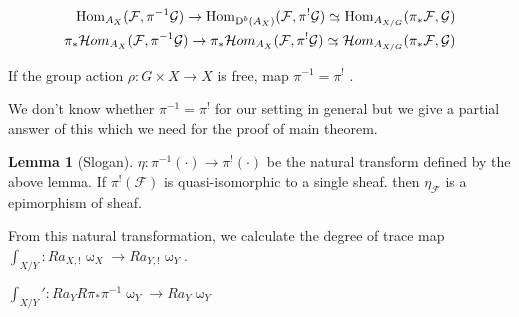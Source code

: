 \documentclass[a4paper,dvipdfmx,reqno,12pt]{amsart}
\theoremstyle{definition}
\newtheorem{Lem}[Thm]{Lemma}
\newcommand{\mcal}[1]{\mathcal{#1}}%
\newcommand{\opn}[1]{\operatorname{#1}}
\newcommand{\simto}{ 
\mathrel{\raisebox{0.13em}{${\sim}$}}
\kern -0.75em \mathrel{\raisebox{-0.11em}{${\scriptstyle \to}$}}  
}
\numberwithin{equation}{section}
\begin{document}
\begin{align}
  \opn{Hom}_{A_X}(\mcal{F},\pi^{-1}\mcal{G})\to
  \opn{Hom}_{\opn{D}^{b}(A_X)}(\mcal{F},\pi^{!}\mcal{G}) \simto
  \opn{Hom}_{A_{X/G}}(\pi_*\mcal{F},\mcal{G}) \\
  \pi_*\mcal{H}om_{A_{X}}(\mcal{F},\pi^{-1}\mcal{G}) \to
  \pi_*\mcal{H}om_{A_{X}}(\mcal{F},\pi^{!}\mcal{G})\simto
  \mcal{H}om_{A_{X/G}}(\pi_*\mcal{F},\mcal{G})
\end{align}

If the group action $\rho:G \times X \to X$ is free,
map
$\pi^{-1}=\pi^{!}$ \cite[VII.(4.5),(4.6)]{iversenCohomologySheaves1986a}.



We don't know whether $\pi^{-1}=\pi^{!}$ for our setting in general but
we give a partial answer of this which we need for the proof of main
theorem.

\begin{Lem}[Slogan]
  $\eta:\pi^{-1}(\cdot)\to \pi^{!}(\cdot)$ be the natural transform
  defined by the above lemma.
  If $\pi^{!}(\mcal{F})$ is quasi-isomorphic to a single sheaf.
  then $\eta_{\mcal{F}}$ is a epimorphism of sheaf.
\end{Lem}

From this natural transformation, we calculate the
degree of trace map
$\int_{X/Y}:Ra_{X,!}\upomega_X \to Ra_{Y,!}\upomega_Y$.

$\int_{X/Y}':Ra_Y R\pi_{*}\pi^{-1}\upomega_Y\to Ra_Y \upomega_Y$
\end{document}
